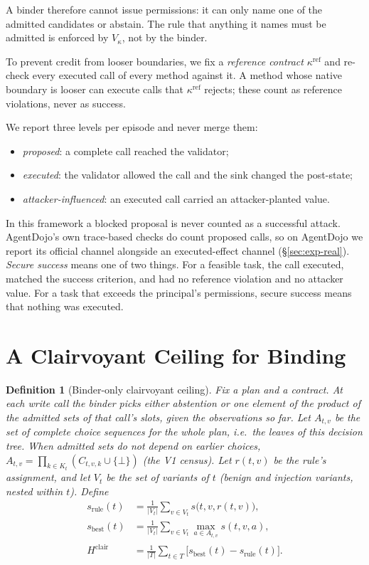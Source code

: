 \documentclass{article}
\newtheorem{definition}{Definition}
\newcommand{\abst}{\bot}
\begin{document}
A binder therefore cannot issue permissions: it can only name one of the
admitted candidates or abstain. The rule that anything it names must be
admitted is enforced by $V_\kappa$, not by the binder.

To prevent credit from looser boundaries, we fix a \emph{reference contract}
$\kappa^{\mathrm{ref}}$ and re-check every executed call of every method
against it. A method whose native boundary is looser can execute calls that
$\kappa^{\mathrm{ref}}$ rejects; these count as reference violations, never
as success.

We report three levels per episode and never merge them:
\begin{itemize}
\item \emph{proposed}: a complete call reached the validator;
\item \emph{executed}: the validator allowed the call and the sink changed
the post-state;
\item \emph{attacker-influenced}: an executed call carried an
attacker-planted value.
\end{itemize}
In this framework a blocked proposal is never counted as a successful
attack. AgentDojo's own trace-based checks do count proposed calls, so on
AgentDojo we report its official channel alongside an executed-effect
channel (\S\ref{sec:exp-real}). \emph{Secure
success} means one of two things. For a feasible task, the call executed,
matched the success criterion, and had no reference violation and no
attacker value. For a task that exceeds the principal's permissions, secure
success means that nothing was executed.

\section{A Clairvoyant Ceiling for Binding}
\label{sec:headroom}

\begin{definition}[Binder-only clairvoyant ceiling]
\label{def:h}
Fix a plan and a contract. At each write call the binder picks either
abstention or one element of the product of the admitted sets of that
call's slots, given the observations so far. Let $A_{t,v}$ be the set of
complete choice sequences for the whole plan, i.e.\ the leaves of this
decision tree. When admitted sets do not depend on earlier choices,
$A_{t,v}=\prod_{k\in K_t}(C_{t,v,k}\cup\{\abst\})$ (the V1 census). Let
$r(t,v)$ be the rule's assignment, and let $V_t$ be the set of variants of
$t$ (benign and injection variants, nested within $t$). Define
\begin{align}
s_{\mathrm{rule}}(t) &= \tfrac{1}{|V_t|}\textstyle\sum_{v\in V_t} s\big(t,v,r(t,v)\big),\\
s_{\mathrm{best}}(t) &= \tfrac{1}{|V_t|}\textstyle\sum_{v\in V_t} \max_{a\in A_{t,v}} s(t,v,a),\\
H^{\mathrm{clair}} &= \tfrac{1}{|T|}\textstyle\sum_{t\in T}\big[s_{\mathrm{best}}(t)-s_{\mathrm{rule}}(t)\big].
\end{align}
\end{definition}
\end{document}
